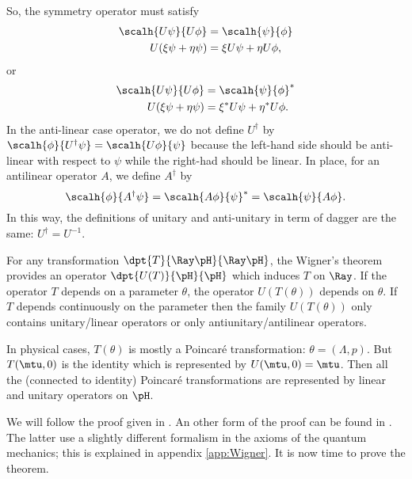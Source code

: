 So, the symmetry operator must satisfy
\begin{subequations}
\begin{align}  
  \scalh{U\psi}{U\phi}&=\scalh{\psi}{\phi}\\
  U(\xi\psi+\eta\psi)&=\xi U\psi+\eta U\phi,
\end{align}  
\end{subequations}
or
\begin{subequations}
\begin{align}
  \scalh{U\psi}{U\phi}&=\scalh{\psi}{\phi}^*\\
  U(\xi\psi+\eta\psi)&=\xi^* U\psi+\eta^* U\phi.
\end{align}  
\end{subequations}
In the anti-linear case operator, we do not define $U^{\dag}$ by $\scalh{\phi}{U^{\dag}\psi}=\scalh{U\phi}{\psi}$ because the left-hand side should be anti-linear with respect to $\psi$ while the right-had should be linear. In place, for an antilinear operator $A$, we define $A^{\dag}$ by
\begin{equation} 
   \scalh{\phi}{A^{\dag}\psi}=\scalh{A\phi}{\psi}^*=\scalh{\psi}{A\phi}.
\end{equation}
In this way, the definitions of unitary and anti-unitary in term of dagger are the same: $U^{\dag}=U^{-1}$.

For any transformation $\dpt{T}{\Ray \pH}{\Ray \pH}$, the Wigner's theorem provides an operator $\dpt{U(T)}{\pH}{\pH}$ which induces $T$ on $\Ray$. If the operator $T$ depends on a parameter $\theta$, the operator $U(T(\theta))$ depends on $\theta$. If $T$ depends continuously on the parameter then the family $U(T(\theta))$ only contains unitary/linear operators or only antiunitary/antilinear operators.

In physical cases, $T(\theta)$ is mostly a Poincaré transformation: $\theta=(\Lambda,p)$. But $T(\mtu,0)$ is the identity which is represented by $U(\mtu,0)=\mtu$. Then all the (connected to identity) Poincaré transformations are represented by linear and unitary operators on $\pH$.

We will follow the proof given in \cite{Weinberg}. An other form of the proof can be found in \cite{Sternberg}. The latter use a slightly different formalism in the axioms of the quantum mechanics; this is explained in appendix \ref{app:Wigner}. It is now time to prove the theorem. 

